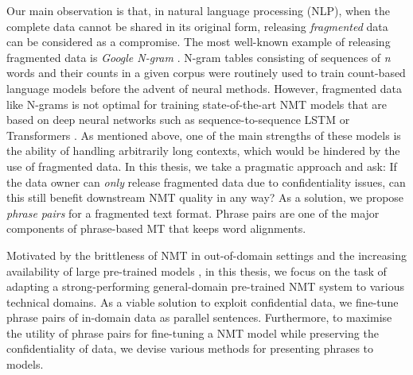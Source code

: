 Our main observation is that, in natural language processing (NLP), when the complete data cannot be shared in its original form, releasing \textit{fragmented} data can be considered as a compromise. The most well-known example of releasing fragmented data is \textit{Google N-gram} \parencite{michel2011quantitative}. N-gram tables consisting of sequences of \textit{n} words and their counts in a given corpus were routinely used to train count-based language models \parencite{kneser-ney, brants-etal-2007-large} before the advent of neural methods. However, fragmented data like N-grams is not optimal for training state-of-the-art NMT models that are based on deep neural networks
such as sequence-to-sequence LSTM \parencite{sutskever2014sequence} or Transformers \parencite{vaswani2017attention}. As mentioned above, one of the main strengths of these models is the ability of handling arbitrarily long contexts, which would be hindered by the use of fragmented data. 
In this thesis, we take a pragmatic approach and ask: If the data owner can \textit{only} release fragmented data due to confidentiality issues, can this still benefit downstream NMT quality in any way? As a solution, we propose \textit{phrase pairs} for a fragmented text format. Phrase pairs are one of the major components of phrase-based MT that keeps word alignments.

Motivated by the brittleness of NMT in out-of-domain settings \parencite{koehn-knowles-2017-six} and the increasing availability of large pre-trained models \parencite{ng-etal-2019-facebook}, in this thesis, we focus on the task of adapting a strong-performing general-domain pre-trained NMT system to various technical domains. As a viable solution to exploit confidential data, we fine-tune phrase pairs of in-domain data as parallel sentences. Furthermore, to maximise the utility of phrase pairs for fine-tuning a NMT model while preserving the confidentiality of data, we devise various methods for presenting phrases to models.
    
